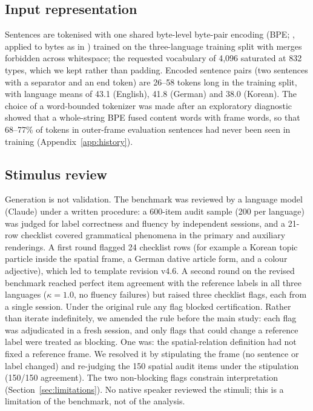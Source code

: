 \documentclass[preprint,12pt,authoryear]{elsarticle}
\begin{document}
\subsection{Input representation}

Sentences are tokenised with one shared byte-level byte-pair encoding (BPE; \citealp{sennrich2016}, applied to bytes as in \citealp{radford2019}) trained on the three-language training split with merges forbidden across whitespace; the requested vocabulary of 4{,}096 saturated at 832 types, which we kept rather than padding. Encoded sentence pairs (two sentences with a separator and an end token) are 26--58 tokens long in the training split, with language means of 43.1 (English), 41.8 (German) and 38.0 (Korean). The choice of a word-bounded tokenizer was made after an exploratory diagnostic showed that a whole-string BPE fused content words with frame words, so that 68--77\% of tokens in outer-frame evaluation sentences had never been seen in training (Appendix~\ref{app:history}).

\subsection{Stimulus review}
\label{sec:review}

Generation is not validation. The benchmark was reviewed by a language model (Claude) under a written procedure: a 600-item audit sample (200 per language) was judged for label correctness and fluency by independent sessions, and a 21-row checklist covered grammatical phenomena in the primary and auxiliary renderings. A first round flagged 24 checklist rows (for example a Korean topic particle inside the spatial frame, a German dative article form, and a colour adjective), which led to template revision v4.6. A second round on the revised benchmark reached perfect item agreement with the reference labels in all three languages ($\kappa{=}1.0$, no fluency failures) but raised three checklist flags, each from a single session. Under the original rule any flag blocked certification. Rather than iterate indefinitely, we amended the rule before the main study: each flag was adjudicated in a fresh session, and only flags that could change a reference label were treated as blocking. One was: the spatial-relation definition had not fixed a reference frame. We resolved it by stipulating the frame (no sentence or label changed) and re-judging the 150 spatial audit items under the stipulation (150/150 agreement). The two non-blocking flags constrain interpretation (Section~\ref{sec:limitations}). No native speaker reviewed the stimuli; this is a limitation of the benchmark, not of the analysis.
\end{document}
